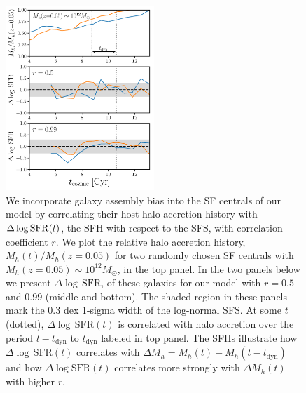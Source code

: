\documentclass[12pt, letterpaper, preprint, tighten]{aastex62}
\newcommand{\logsfr}{\log\mathrm{SFR}}
\begin{document}
\begin{figure}
\begin{center}
\includegraphics[width=0.5\textwidth]{figs/Mhacc_dSFR.pdf}
\caption{
    We incorporate galaxy assembly bias into the SF centrals of our model by
    correlating their host halo accretion history with $\Delta\log{\rm SFR}(t)$, 
    the SFH with respect to the SFS, with correlation coefficient $r$. 
    We plot the relative halo accretion history, $M_h(t)/M_h(z{=}0.05)$
    for two randomly chosen SF centrals with $M_h(z{=}0.05)\sim10^{12}M_\odot$,
    in the top panel. In the two panels below we present $\Delta\log\,\mathrm{SFR}$,
    of these galaxies for our model with $r=0.5$ and $0.99$ (middle and bottom). 
    The shaded region in these panels mark the $0.3$ dex 1-sigma width of the 
    log-normal SFS. At some $t$ (dotted),
    $\Delta\log\,\mathrm{SFR}(t)$ is correlated with halo accretion over the
    period $t - t_\mathrm{dyn}$ to $t_\mathrm{dyn}$ labeled in top panel. The
    SFHs illustrate how $\Delta\log\,\mathrm{SFR}(t)$ correlates with
    $\Delta M_h = M_h(t) - M_h(t-t_\mathrm{dyn})$ and how $\Delta\logsfr(t)$
    correlates more strongly with $\Delta M_h(t)$ with higher $r$.}
\label{fig:mhacc_dsfr}
\end{center}
\end{figure}
\end{document}
